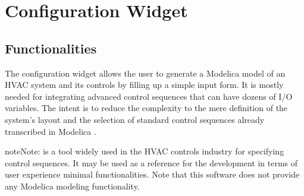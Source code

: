 \documentclass[letterpaper,10pt, openany,english]{sphinxmanual}
\begin{document}
\section{Configuration Widget}
\label{\detokenize{requirements:configuration-widget}}\label{\detokenize{requirements:sec-configuration-widget}}

\subsection{Functionalities}
\label{\detokenize{requirements:functionalities}}
The configuration widget allows the user to generate a Modelica model of an HVAC system and its controls by filling up a simple input form.
It is mostly needed for integrating advanced control sequences that can have dozens of I/O variables.
The intent is to reduce the complexity to the mere definition of the system’s layout and the selection of standard control sequences already transcribed in Modelica .

\begin{sphinxadmonition}{note}{Note:}
 is a tool widely used in the HVAC controls industry for specifying control sequences. It may be used as a reference for the development in terms of user experience minimal functionalities. Note that this software does not provide any Modelica modeling functionality.
\end{sphinxadmonition}
\end{document}
